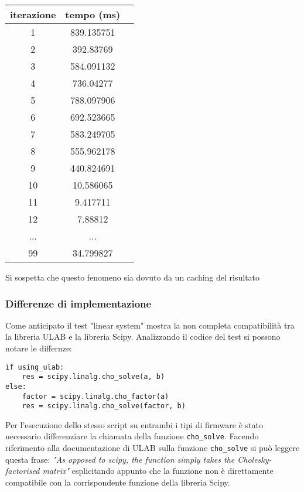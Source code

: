 \documentclass[12pt,a4paper]{report}
\begin{document}
\begin{center}
\begin{tabular}{|c | c | c |}
\hline
iterazione & tempo (ms) \\
\hline
1 & 839.135751 \\
2 & 392.83769 \\
3 & 584.091132 \\
4 & 736.04277 \\
5 & 788.097906 \\
6 & 692.523665 \\
7 & 583.249705 \\
8 & 555.962178 \\
9 & 440.824691 \\
10 & 10.586065 \\
11 & 9.417711 \\
12 & 7.88812 \\
... & ... \\
\hline
99 & 34.799827 \\
\hline
\end{tabular}
\end{center}

Si sospetta che questo fenomeno sia dovuto da un caching del risultato

\subsubsection{Differenze di implementazione}

Come anticipato il test "linear system" mostra la non completa compatibilità tra la libreria ULAB e la libreria Scipy.
Analizzando il codice del test si possono notare le differnze:

\begin{verbatim}
if using_ulab:
    res = scipy.linalg.cho_solve(a, b)
else:  
    factor = scipy.linalg.cho_factor(a)
    res = scipy.linalg.cho_solve(factor, b)
\end{verbatim}

Per l'esecuzione dello stesso script su entrambi i tipi di firmware è stato necessario differenziare la chiamata della funzione 
\texttt{cho\_solve}. Facendo riferimento alla documentazione di ULAB sulla funzione \texttt{cho\_solve} \cite{ulab_cholesky} si 
può leggere questa frase: \textit{"As opposed to scipy, the function simply takes the Cholesky-factorised matrix"} esplicitando appunto che la funzione non è direttamente compatibile con la corrispondente funzione della libreria Scipy.\\
\end{document}
